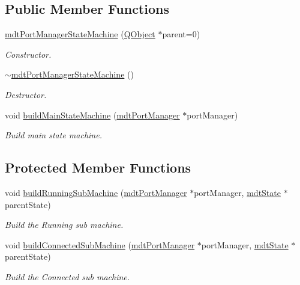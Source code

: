 \subsection*{Public Member Functions}
\begin{DoxyCompactItemize}
\item 
\hyperlink{classmdt_port_manager_state_machine_a1e5e5c8c2d5338d8d719de75aebfe987}{mdt\-Port\-Manager\-State\-Machine} (\hyperlink{class_q_object}{Q\-Object} $\ast$parent=0)
\begin{DoxyCompactList}\small\item\em Constructor. \end{DoxyCompactList}\item 
\hyperlink{classmdt_port_manager_state_machine_a4402d5fd2fdc1bcbfd0db105f7b2df61}{$\sim$mdt\-Port\-Manager\-State\-Machine} ()
\begin{DoxyCompactList}\small\item\em Destructor. \end{DoxyCompactList}\item 
void \hyperlink{classmdt_port_manager_state_machine_a114c1775a071d8cabf484e22638b4fc1}{build\-Main\-State\-Machine} (\hyperlink{classmdt_port_manager}{mdt\-Port\-Manager} $\ast$port\-Manager)
\begin{DoxyCompactList}\small\item\em Build main state machine. \end{DoxyCompactList}\end{DoxyCompactItemize}
\subsection*{Protected Member Functions}
\begin{DoxyCompactItemize}
\item 
void \hyperlink{classmdt_port_manager_state_machine_a174b87f542465ddf3ee0d5db734eff40}{build\-Running\-Sub\-Machine} (\hyperlink{classmdt_port_manager}{mdt\-Port\-Manager} $\ast$port\-Manager, \hyperlink{classmdt_state}{mdt\-State} $\ast$parent\-State)
\begin{DoxyCompactList}\small\item\em Build the Running sub machine. \end{DoxyCompactList}\item 
void \hyperlink{classmdt_port_manager_state_machine_ad1f31fb972594b42b91359483316915f}{build\-Connected\-Sub\-Machine} (\hyperlink{classmdt_port_manager}{mdt\-Port\-Manager} $\ast$port\-Manager, \hyperlink{classmdt_state}{mdt\-State} $\ast$parent\-State)
\begin{DoxyCompactList}\small\item\em Build the Connected sub machine. \end{DoxyCompactList}\end{DoxyCompactItemize}
